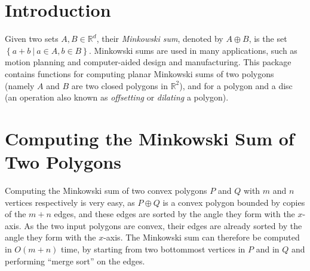 \section{Introduction}
\label{mink_sec:intro}
 
Given two sets $A,B \in \mathbb{R}^d$, their \emph{Minkowski sum},
denoted by $A \oplus B$, is the set $\left\{ a + b ~|~ a \in
A, b \in B \right\}$. Minkowski sums are used in many applications,
such as motion planning and computer-aided design and
manufacturing. This package contains functions for computing planar
Minkowski sums of two polygons (namely $A$ and $B$ are two closed
polygons in $\mathbb{R}^2$), and for a polygon and a disc (an operation
also known as \emph{offsetting} or \emph{dilating} a polygon).

\section{Computing the Minkowski Sum of Two Polygons}
\label{mink_sec:sum_poly}

Computing the Minkowski sum of two convex polygons $P$ and $Q$ with
$m$ and $n$ vertices respectively is very easy, as $P \oplus Q$ is a
convex polygon bounded by copies of the $m + n$ edges, and these edges
are sorted by the angle they form with the $x$-axis. As the two
input polygons are convex, their edges are already sorted by the
angle they form with the $x$-axis. The Minkowski sum can therefore be
computed in $O(m + n)$ time, by starting from two bottommost vertices
in $P$ and in $Q$ and performing ``merge sort'' on the edges.

